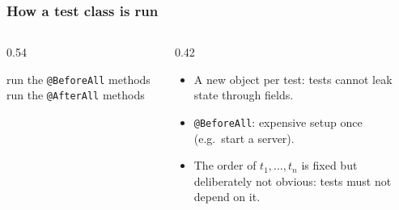 \documentclass[aspectratio=169,10pt,compress]{beamer}
\begin{document}
\begin{frame}[t,fragile] \frametitle{How a test class is run}
  \begin{columns}[T]
    \begin{column}{0.54\textwidth}
      \SetAlFnt{\small}


\begin{algorithm}[H]
  \caption{Running one test class (Jupiter)}
  run the \texttt{@BeforeAll} methods\;
  run the \texttt{@AfterAll} methods\;
\end{algorithm}

    \end{column}
    \begin{column}{0.42\textwidth}
      \begin{itemize}\small
        \item A new object per test: tests cannot leak state through fields.
        \item \texttt{@BeforeAll}: expensive setup once (e.g.\ start a server).
        \item The order of $t_{1}, \dots, t_{n}$ is fixed but deliberately not obvious: tests must not depend on it.
      \end{itemize}
    \end{column}
  \end{columns}
\end{frame}

\end{document}

